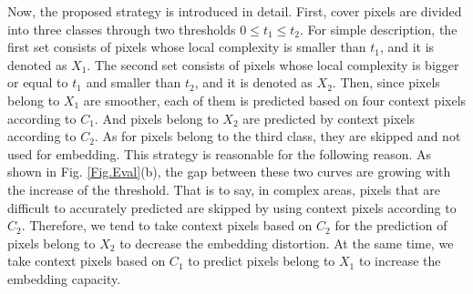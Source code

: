 \documentclass[review,3p,10pt,sort&compress]{elsarticle}
\begin{document}
Now, the proposed strategy is introduced in detail. First, cover pixels are divided into three classes through two thresholds $0 \leq t_1 \leq t_2$. For simple description, the first set consists of pixels whose local complexity is smaller than $t_1$, and it is denoted as $X_{1}$. The second set consists of pixels whose local complexity is bigger or equal to $t_1$ and smaller than $t_2$, and it is denoted as $X_{2}$. Then, since pixels belong to $X_1$ are smoother, each of them is predicted based on four context pixels according to $C_1$. And pixels belong to $X_2$ are predicted by context pixels according to $C_2$. As for pixels belong to the third class, they are skipped and not used for embedding. This strategy is reasonable for the following reason. As shown in Fig. \ref{Fig.Eval}(b), the gap between these two curves are growing with the increase of the threshold. That is to say, in complex areas, pixels that are difficult to accurately predicted are skipped by using context pixels according to $C_2$. Therefore, we tend to take context pixels based on $C_2$ for the prediction of pixels belong to $X_2$ to decrease the embedding distortion. At the same time, we take context pixels based on $C_1$ to predict pixels belong to $X_1$ to increase the embedding capacity.


\end{document}
